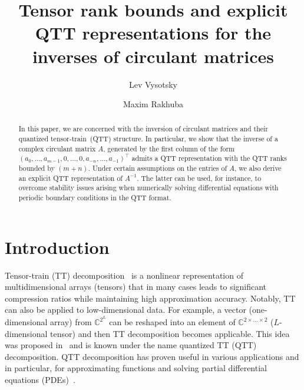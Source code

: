 \documentclass[a4paper]{article}
\title{Tensor rank bounds and explicit QTT representations for the inverses of circulant matrices}
\author[1,2]{Lev Vysotsky}
\author[1]{Maxim Rakhuba}
\affil[1]{HSE University, Pokrovsky Boulevard 11, Moscow, 109028 Russia}
\affil[2]{Marchuk Institute of Numerical Mathematics of the Russian Academy of Sciences, 119333 Moscow, Russia}
\date{}
\newcommand{\LL}{L}
\begin{document}
\maketitle
\begin{abstract}
    In this paper, we are concerned with the inversion of circulant matrices and their quantized tensor-train~(QTT) structure.
    In particular, we show that the inverse of a complex circulant matrix $A$, generated by the first column of the form $(a_0,\dots,a_{m-1},0,\dots,0,a_{-n},\dots, a_{-1})^\top$ admits a QTT representation with the QTT ranks bounded by $(m+n)$. 
    Under certain assumptions on the entries of $A$, we also derive an explicit QTT representation of $A^{-1}$. The latter can be used, for instance, to overcome stability issues arising when numerically solving differential equations with periodic boundary conditions in the QTT format.
\end{abstract}
	

	
\section{Introduction}	

Tensor-train (TT) decomposition~\cite{osel-tt-2011} is a nonlinear representation of multidimensional arrays (tensors) that in many cases leads to significant compression ratios while maintaining high approximation accuracy.
Notably, TT can also be applied to low-dimensional data. 
For example, a vector (one-dimensional array) from $\mathbb{C}^{2^\LL}$ can be reshaped into an element of $\mathbb{C}^{2 \times \dots \times 2}$ ($\LL$-dimensional tensor) and then TT decomposition becomes applicable.
This idea was proposed in~\cite{osel-2d2d-2010,khor-qtt-2011} and is known under the name quantized TT (QTT) decomposition.
QTT decomposition has proven useful in various applications and in particular, for approximating functions and solving partial differential equations (PDEs)~\cite{khoromskij2018tensor}.
\end{document}
